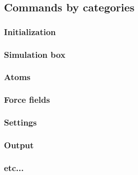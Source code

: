\subsection{Commands by categories}
\subsubsection{Initialization}
\subsubsection{Simulation box}
\subsubsection{Atoms}
\subsubsection{Force fields}
\subsubsection{Settings}
\subsubsection{Output}
\subsubsection{etc...}
